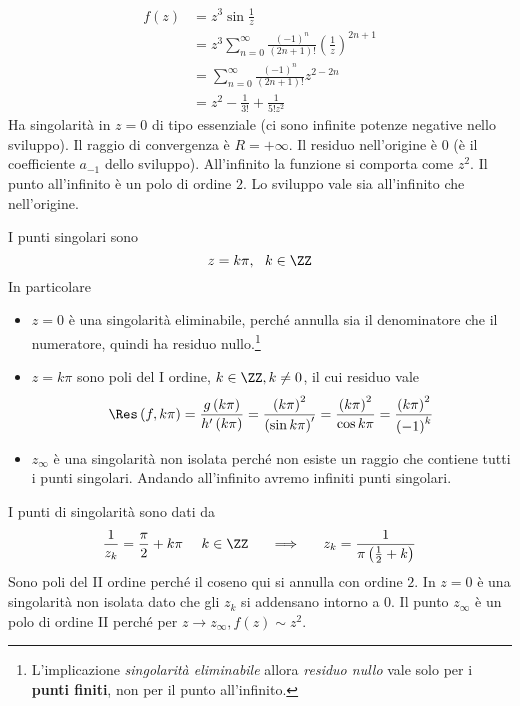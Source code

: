 \Soluzione

\begin{align*}
f(z) & = z^{3}\sin\frac{1}{z}\\
 & = z^{3}\sum\limits^{\infty}_{n = 0}\frac{\left(- 1\right)^{n}}{\left(2n + 1\right) !}\left(\frac{1}{z}\right)^{2n + 1}\\
 & = \sum\limits^{\infty}_{n = 0}\frac{\left(- 1\right)^{n}}{\left(2n + 1\right) !} z^{2 - 2n}\\
 & = z^{2} - \frac{1}{3!} + \frac{1}{5!z^{2}}
\end{align*}
Ha singolarità in $z = 0$ di tipo essenziale (ci sono infinite potenze negative nello sviluppo). Il raggio di convergenza è $R = +\infty $. Il residuo nell'origine è $0$ (è il coefficiente $a_{- 1}$ dello sviluppo). All'infinito la funzione si comporta come $z^{2}$. Il punto all'infinito è un polo di ordine $2$. Lo sviluppo vale sia all'infinito che nell'origine.

\Soluzione

I punti singolari sono
\begin{equation*}
z = k\pi, \ \ k\in \ZZ
\end{equation*}
In particolare
\begin{itemize}
\item $z = 0$ è una singolarità eliminabile, perché annulla sia il denominatore che il numeratore, quindi ha residuo nullo.\footnote{L'implicazione \textit{singolarità eliminabile} allora \textit{residuo nullo} vale solo per i \textbf{punti finiti}, non per il punto all'infinito.}
\item $z = k\pi $ sono poli del I ordine, $k\in \ZZ, k\neq 0$, il cui residuo vale
\begin{equation*}
\Res \left(f, k\pi \right) = \frac{g\left(k\pi \right)}{h'\left(k\pi \right)} = \frac{\left(k\pi \right)^{2}}{\left(\sin k\pi \right)'} = \frac{\left(k\pi \right)^{2}}{\cos k\pi} = \frac{\left(k\pi \right)^{2}}{\left(- 1\right)^{k}}
\end{equation*}
\item $z_{\infty}$ è una singolarità non isolata perché non esiste un raggio che contiene tutti i punti singolari. Andando all'infinito avremo infiniti punti singolari.
\end{itemize}

\Soluzione

I punti di singolarità sono dati da
\begin{equation*}
\frac{1}{z_{k}} = \frac{\pi}{2} + k\pi \ \ \ \ k\in \ZZ \ \ \ \ \implies \ \ \ \ z_{k} = \frac{1}{\pi \left(\frac{1}{2} + k\right)}
\end{equation*}
Sono poli del II ordine perché il coseno qui si annulla con ordine $2$. In $z = 0$ è una singolarità non isolata dato che gli $z_{k}$ si addensano intorno a $0$. Il punto $z_{\infty}$ è un polo di ordine II perché per $z\rightarrow z_{\infty}, f(z) \sim z^{2}$.

